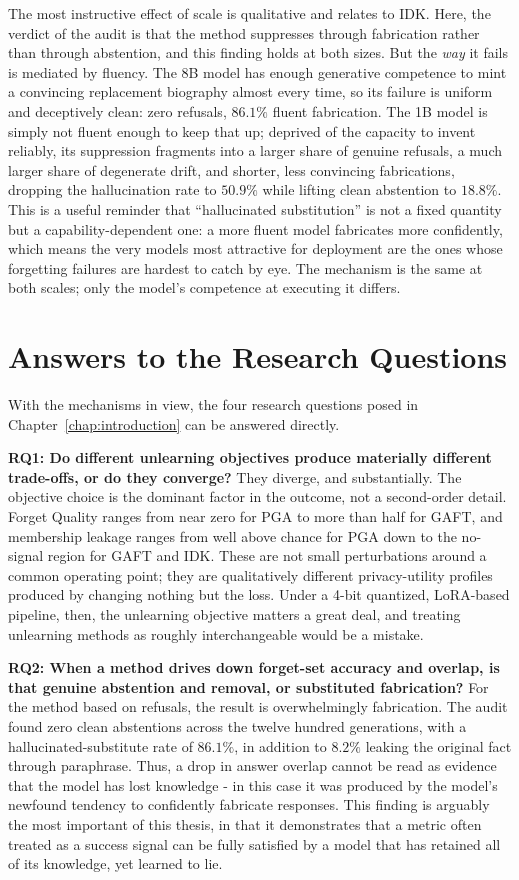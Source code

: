 \documentclass[a4paper,12pt]{report}
\begin{document}
The most instructive effect of scale is qualitative and relates to IDK. Here, the verdict of the audit is that the method suppresses through fabrication rather than through abstention, and this finding holds at both sizes. But the \emph{way} it fails is mediated by fluency. The 8B model has enough generative competence to mint a convincing replacement biography almost every time, so its failure is uniform and deceptively clean: zero refusals, $86.1\%$ fluent fabrication. The 1B model is simply not fluent enough to keep that up; deprived of the capacity to invent reliably, its suppression fragments into a larger share of genuine refusals, a much larger share of degenerate drift, and shorter, less convincing fabrications, dropping the hallucination rate to $50.9\%$ while lifting clean abstention to $18.8\%$. This is a useful reminder that ``hallucinated substitution'' is not a fixed quantity but a capability-dependent one: a more fluent model fabricates more confidently, which means the very models most attractive for deployment are the ones whose forgetting failures are hardest to catch by eye. The mechanism is the same at both scales; only the model's competence at executing it differs.

\section{Answers to the Research Questions}
\label{sec:disc-rqs}
With the mechanisms in view, the four research questions posed in Chapter~\ref{chap:introduction} can be answered directly.

\textbf{RQ1: Do different unlearning objectives produce materially different trade-offs, or do they converge?} They diverge, and substantially. The objective choice is the dominant factor in the outcome, not a second-order detail. Forget Quality ranges from near zero for PGA to more than half for GAFT, and membership leakage ranges from well above chance for PGA down to the no-signal region for GAFT and IDK. These are not small perturbations around a common operating point; they are qualitatively different privacy-utility profiles produced by changing nothing but the loss. Under a 4-bit quantized, LoRA-based pipeline, then, the unlearning objective matters a great deal, and treating unlearning methods as roughly interchangeable would be a mistake.

\textbf{RQ2: When a method drives down forget-set accuracy and overlap, is that genuine abstention and removal, or substituted fabrication?} For the method based on refusals, the result is overwhelmingly fabrication. The audit found zero clean abstentions across the twelve hundred generations, with a hallucinated-substitute rate of $86.1\%$, in addition to $8.2\%$ leaking the original fact through paraphrase. Thus, a drop in answer overlap cannot be read as evidence that the model has lost knowledge - in this case it was produced by the model's newfound tendency to confidently fabricate responses. This finding is arguably the most important of this thesis, in that it demonstrates that a metric often treated as a success signal can be fully satisfied by a model that has retained all of its knowledge, yet learned to lie.
\end{document}
